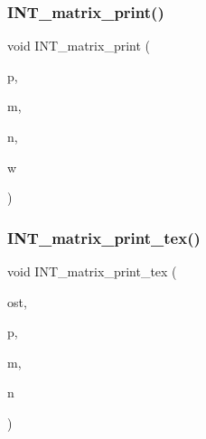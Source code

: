 \mbox{\label{util_8_c_ab819632eb2bd36be75704bb5c9c563aa}} 
\subsubsection{\texorpdfstring{I\+N\+T\+\_\+matrix\+\_\+print()}{INT\_matrix\_print()}\hspace{0.1cm}{\footnotesize\ttfamily [2/2]}}
{\footnotesize\ttfamily void I\+N\+T\+\_\+matrix\+\_\+print (\begin{DoxyParamCaption}\item[{\mbox{\hyperlink{galois_8h_a09fddde158a3a20bd2dcadb609de11dc}{I\+NT}} $\ast$}]{p,  }\item[{\mbox{\hyperlink{galois_8h_a09fddde158a3a20bd2dcadb609de11dc}{I\+NT}}}]{m,  }\item[{\mbox{\hyperlink{galois_8h_a09fddde158a3a20bd2dcadb609de11dc}{I\+NT}}}]{n,  }\item[{\mbox{\hyperlink{galois_8h_a09fddde158a3a20bd2dcadb609de11dc}{I\+NT}}}]{w }\end{DoxyParamCaption})}

\mbox{\label{util_8_c_af68a4f4000e48d0778fbcb424707affb}} 
\subsubsection{\texorpdfstring{I\+N\+T\+\_\+matrix\+\_\+print\+\_\+tex()}{INT\_matrix\_print\_tex()}}
{\footnotesize\ttfamily void I\+N\+T\+\_\+matrix\+\_\+print\+\_\+tex (\begin{DoxyParamCaption}\item[{ostream \&}]{ost,  }\item[{\mbox{\hyperlink{galois_8h_a09fddde158a3a20bd2dcadb609de11dc}{I\+NT}} $\ast$}]{p,  }\item[{\mbox{\hyperlink{galois_8h_a09fddde158a3a20bd2dcadb609de11dc}{I\+NT}}}]{m,  }\item[{\mbox{\hyperlink{galois_8h_a09fddde158a3a20bd2dcadb609de11dc}{I\+NT}}}]{n }\end{DoxyParamCaption})}

